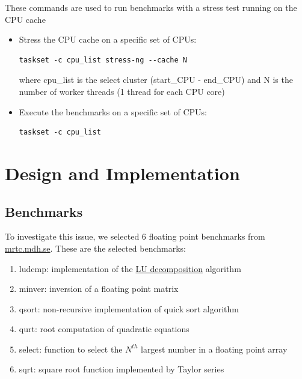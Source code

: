 These commands are used to run benchmarks with a stress test running on the CPU cache

\begin{itemize}
	\item Stress the CPU cache on a specific set of CPUs:\begin{verbatim}taskset -c cpu_list stress-ng --cache N \end{verbatim} where cpu\_list is the select cluster (start\_CPU - end\_CPU) and N is the number of worker threads (1 thread for each CPU core)
	\item Execute the benchmarks on a specific set of CPUs: \begin{verbatim}taskset -c cpu_list\end{verbatim}
\end{itemize}

\section{Design and Implementation}

\subsection{Benchmarks}

To investigate this issue, we selected 6 floating point benchmarks from \href{http://www.mrtc.mdh.se/projects/wcet/benchmarks.html}{mrtc.mdh.se}.
These are the selected benchmarks:
\begin{enumerate}
	\item ludcmp: implementation of the \href{https://en.wikipedia.org/wiki/LU_decomposition}{LU decomposition} algorithm
	\item minver: inversion of a floating point matrix
	\item qsort: non-recursive implementation of quick sort algorithm
	\item qurt: root computation of quadratic equations
	\item select: function to select the ${N}^{th}$ largest number in a floating point array
	\item sqrt: square root function implemented by Taylor series
\end{enumerate}

